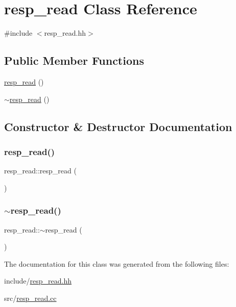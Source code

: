 \hypertarget{classresp__read}{}\section{resp\+\_\+read Class Reference}
\label{classresp__read}


{\ttfamily \#include $<$resp\+\_\+read.\+hh$>$}

\subsection*{Public Member Functions}
\begin{DoxyCompactItemize}
\item 
\mbox{\hyperlink{classresp__read_ac9785de9ad22ff8dbdddbd084fa2754c}{resp\+\_\+read}} ()
\item 
\mbox{\hyperlink{classresp__read_ac135ec4a7eb50623aaf28eda054ea12c}{$\sim$resp\+\_\+read}} ()
\end{DoxyCompactItemize}


\subsection{Constructor \& Destructor Documentation}
\mbox{\label{classresp__read_ac9785de9ad22ff8dbdddbd084fa2754c}} 
\subsubsection{\texorpdfstring{resp\+\_\+read()}{resp\_read()}}
{\footnotesize\ttfamily resp\+\_\+read\+::resp\+\_\+read (\begin{DoxyParamCaption}{ }\end{DoxyParamCaption})}

\mbox{\label{classresp__read_ac135ec4a7eb50623aaf28eda054ea12c}} 
\subsubsection{\texorpdfstring{$\sim$resp\+\_\+read()}{~resp\_read()}}
{\footnotesize\ttfamily resp\+\_\+read\+::$\sim$resp\+\_\+read (\begin{DoxyParamCaption}{ }\end{DoxyParamCaption})}



The documentation for this class was generated from the following files\+:\begin{DoxyCompactItemize}
\item 
include/\mbox{\hyperlink{resp__read_8hh}{resp\+\_\+read.\+hh}}\item 
src/\mbox{\hyperlink{resp__read_8cc}{resp\+\_\+read.\+cc}}\end{DoxyCompactItemize}

